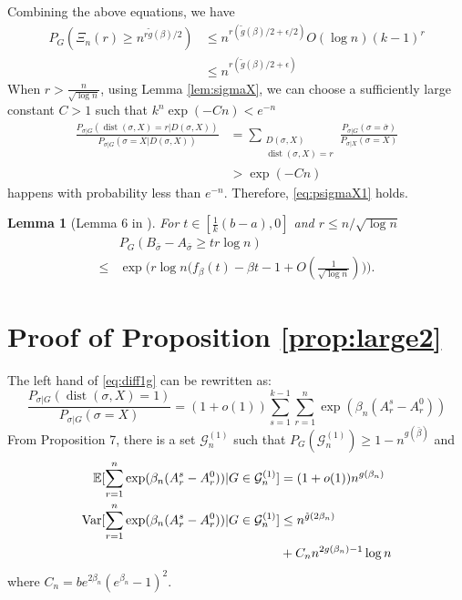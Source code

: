 \documentclass[journal]{IEEEtran}
\newtheorem{lemma}{Lemma}
\newcommand{\cG}{\mathcal{G}}
\newcommand{\1}{\mathbbm{1}}
\DeclareMathOperator{\Var}{Var}
\DeclareMathOperator{\dist}{dist}
\begin{document}
Combining the above equations, we have
\begin{align*}
P_{G}(\Xi_n(r) \geq n^{r \tilde{g}(\beta) /2}) &\leq  n^{r(\tilde{g}(\beta)/2 + \epsilon/2)} O(\log n) (k-1)^r\\
&\leq n^{r(\tilde{g}(\beta)/2 + \epsilon)}
\end{align*}
When $r>\frac{n}{\sqrt{\log n}}$, using Lemma \ref{lem:sigmaX}, we can choose a sufficiently large constant $C>1$
such that $k^n\exp(-Cn) < e^{-n}$
\begin{align*}
\frac{P_{\sigma|G}(\dist(\sigma, X)=r | D(\sigma, X))}
{P_{\sigma|G}(\sigma=X | D(\sigma, X))} &= \sum_{\substack{D(\sigma, X) \\ \dist(\sigma, X)=r}} \frac{P_{\sigma | G}(\sigma = \bar{\sigma}) }{P_{\sigma | X}(\sigma = X)} \\
&> \exp(-Cn)
\end{align*}
happens with probability less than $e^{-n}$. Therefore, \eqref{eq:psigmaX1} holds.
\begin{lemma}[Lemma 6 in \cite{sibmmc}]\label{lem:enhanced_fb}
	For $t\in [\frac{1}{k}(b-a), 0]$
	and $ r \le n/\sqrt{\log n}$
	\begin{equation} \label{eq:upmpt}
	\begin{aligned}
	& P_G(B_{\bar{\sigma}}-A_{\bar{\sigma}}\ge t r \log n)  \\
	\le & \exp\Big(r\log n
	\Big(f_{\beta}(t) - \beta t -1	+ O(\frac{1}{\sqrt{\log n}}) \Big)\Big) .
	\end{aligned}
	\end{equation}
\end{lemma}
\section*{Proof of Proposition \ref{prop:large2}}
The left hand of \eqref{eq:diff1g} can be rewritten as:
\begin{equation}\label{eq:knd}
	\frac{P_{\sigma|G}(\dist(\sigma, X)=1)}
{P_{\sigma|G}(\sigma=X)}= (1+o(1))\sum_{s=1}^{k-1}\sum_{r=1}^n \exp(\beta_n (A_r^s - A_r^0))
\end{equation}
From Proposition 7, there is a set $\cG^{(1)}_n$ such that $P_G(\cG^{(1)}_n) \geq 1-n^{g(\bar{\beta})}$
and
\begin{align}
\mathbb{E}[\sum_{r=1}^n \exp(\beta_n (A_r^s - A_r^0)) | G \in \cG^{(1)}_n] &= (1+o(1))n^{g(\beta_n)} \\
\Var[\sum_{r=1}^n \exp(\beta_n (A_r^s - A_r^0)) | G \in \cG^{(1)}_n] &\leq n^{\tilde{g}(2\beta_n)} \notag \\
&+ C_n n^{2g(\beta_n)-1}\log n
\end{align}
where $C_n = be^{2\beta_n}(e^{\beta_n}-1)^2$.
\end{document}

